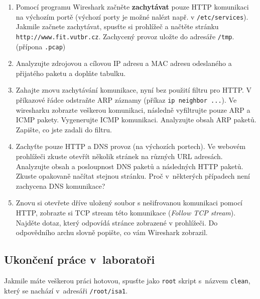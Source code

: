 \begin{enumerate}
  \item Pomocí programu Wireshark začněte \textbf{zachytávat} pouze HTTP komunikaci na výchozím portě
    (výchozí porty je možné nalézt např. v \texttt{/etc/services}). Jakmile začnete zachytávat, spusťte si prohlížeč a načtěte stránku \texttt{http://www.fit.vutbr.cz}. Zachycený provoz uložte do adresáře \texttt{/tmp}. (přípona \texttt{.pcap})
\item Analyzujte zdrojovou a cílovou IP adresu a MAC adresu odeslaného a
  přijatého paketu a doplňte tabulku.
\item Zahajte znovu zachytávání komunikace, nyní bez použití filtru pro HTTP. V příkazové řádce odstraňte ARP záznamy (příkaz \texttt{ip neighbor ...}). Ve wiresharku zobrazte veškerou komunikaci, následně vyfiltrujte pouze ARP a ICMP pakety. Vygenerujte ICMP komunikaci. Analyzujte obsah ARP paketů. Zapište, co jste zadali do filtru.
\item Zachyťte pouze HTTP a DNS provoz (na výchozích portech). Ve webovém prohlížeči zkuste otevřít několik stránek na různých URL adresách. Analyzujte obsah a posloupnost DNS paketů a následných HTTP paketů. Zkuste opakovaně načítat stejnou stránku. Proč v~některých případech není zachycena DNS komunikace?
\item Znovu si otevřete dříve uložený soubor s nešifrovanou komunikaci pomocí
  HTTP, zobrazte si TCP stream této komunikace (\emph{Follow TCP stream}).
    Najděte dotaz, který odpovídá stránce zobrazené v prohlížeči.
 Do
    odpovědního archu slovně popište, co vám Wireshark zobrazil.
\end{enumerate}

\subsection{Ukončení práce v~laboratoři}
Jakmile máte veškerou práci hotovou, spusťte jako \texttt{root} skript s~názvem \texttt{clean}, který se nachází v~adresáři \texttt{/root/isa1}.
